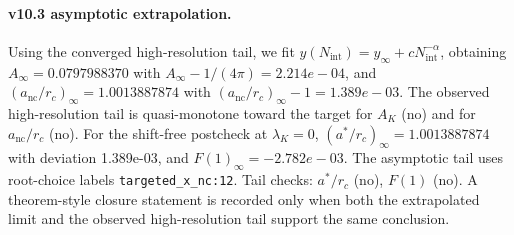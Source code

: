 \paragraph{v10.3 asymptotic extrapolation.}
Using the converged high-resolution tail, we fit $y(N_{\mathrm{int}})=y_{\infty}+cN_{\mathrm{int}}^{-\alpha}$, obtaining $A_\infty=0.0797988370$ with $A_\infty-1/(4\pi)=2.214e-04$, and $(a_{\mathrm{nc}}/r_c)_\infty=1.0013887874$ with $(a_{\mathrm{nc}}/r_c)_\infty-1=1.389e-03$. The observed high-resolution tail is quasi-monotone toward the target for $A_K$ (no) and for $a_{\mathrm{nc}}/r_c$ (no). For the shift-free postcheck at $\lambda_K=0$, $(a^*/r_c)_\infty=1.0013887874$ with deviation 1.389e-03, and $F(1)_\infty=-2.782e-03$. The asymptotic tail uses root-choice labels \texttt{targeted_x_nc:12}. Tail checks: $a^*/r_c$ (no), $F(1)$ (no). A theorem-style closure statement is recorded only when both the extrapolated limit and the
observed high-resolution tail support the same conclusion.
